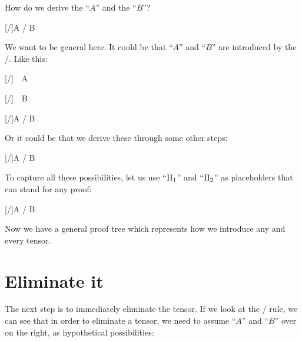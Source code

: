 \documentclass[../../../main.tex]{subfiles}
\begin{document}
\noindent
How do we derive the ``$A$'' and the ``$B$''?

\begin{prooftree*}
  \ellipsis{}{}

  \ellipsis{}{}

  [\tensorIntro/]{A \tensor/ B}
\end{prooftree*}

\noindent
We want to be general here. It could be that ``$A$'' and ``$B$'' are introduced by the \startrule/. Like this:

\begin{prooftree*}
  \hypo{}
  [\startrule/]{~~A~~}

  \hypo{}
  [\startrule/]{~~B~~}

  [\tensorIntro/]{A \tensor/ B}
\end{prooftree*}

\noindent
Or it could be that we derive these through some other steps:

\begin{prooftree*}
  \ellipsis{}{}

  \ellipsis{}{}

  [\tensorIntro/]{A \tensor/ B}
\end{prooftree*}

\noindent
To capture all these possibilities, let us use ``$\Proof/_{1}$'' and ``$\Proof/_{2}$'' as placeholders that can stand for any proof:

\begin{prooftree*}
  \ellipsis{}{}

  \ellipsis{}{}

  [\tensorIntro/]{A \tensor/ B}
\end{prooftree*}

\noindent
Now we have a general proof tree which represents how we introduce any and every tensor.


\section{Eliminate it}

The next step is to immediately eliminate the tensor. If we look at the \tensorElim/ rule, we can see that in order to eliminate a tensor, we need to assume ``$A$'' and ``$B$'' over on the right, as hypothetical possibilities:
\end{document}
